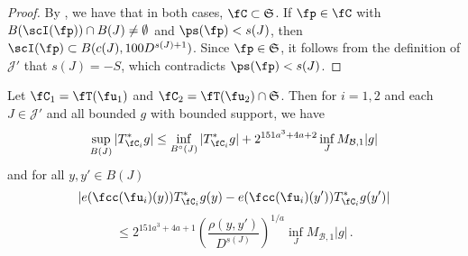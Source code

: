     \begin{proof}
        \leanok
        By , we have that in both cases, $\fC \subset \mathfrak{S}$. If $\fp \in \fC$ with $B(\scI(\fp)) \cap B(J) \neq \emptyset$ and $\ps(\fp) < s(J)$, then $\scI(\fp) \subset B(c(J), 100 D^{s(J) + 1})$. Since $\fp \in \mathfrak{S}$, it follows from the definition of $\mathcal{J}'$ that $s(J) = -S$, which contradicts $\ps(\fp) < s(J)$.
    \end{proof}

    \begin{lemma}
        \label{global-tree-control-1}
        \leanok
        Let $\fC_1 = \fT(\fu_1)$ and $\fC_2 = \fT(\fu_2) \cap \mathfrak{S}$. Then for $i = 1,2$ and each $J \in \mathcal{J}'$ and all bounded $g$ with bounded support, we have
        \begin{align}
            \label{TreeUB}
            \sup_{B(J)} |T_{\fC_i}^*g| \leq \inf_{B^\circ{}(J)} |T^*_{\fC_i} g| + 2^{151a^3+4a+2} \inf_{J} M_{\mathcal{B}, 1} |g|
        \end{align}
        and for all $y,y' \in B(J)$
        $$
            |e(\fcc(\fu_i)(y)) T_{\fC_i}^* g(y) - e(\fcc(\fu_i)(y')) T_{\fC_i}^* g(y')|
        $$
        \begin{equation}
            \label{TreeHolder}
             \le 2^{151a^3+4a+1} \left(\frac{\rho(y,y')}{D^{s(J)}}\right)^{1/a} \inf_J M_{\mathcal{B},1} |g|\,.
        \end{equation}
    \end{lemma}

